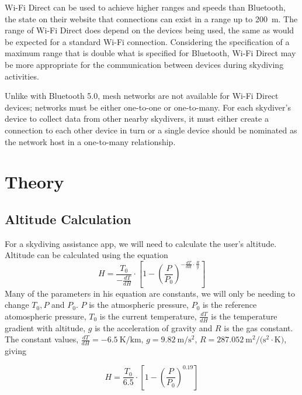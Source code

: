 \documentclass[11pt, twocolumn]{article}
\begin{document}
Wi-Fi Direct can be used to achieve higher ranges and speeds than Bluetooth, the \citeauthor{wi-fi_alliance_wi-fi_nodate} state on their website that connections can exist in a range up to \SI{200}{\metre}. The range of Wi-Fi Direct does depend on the devices being used, the same as would be expected for a standard Wi-Fi connection. Considering the specification of a maximum range that is double what is specified for Bluetooth, Wi-Fi Direct may be more appropriate for the communication between devices during skydiving activities.

Unlike with Bluetooth 5.0, mesh networks are not available for Wi-Fi Direct devices; networks must be either one-to-one or one-to-many. For each skydiver's device to collect data from other nearby skydivers, it must either create a connection to each other device in turn or a single device should be nominated as the network host in a one-to-many relationship.

\section{Theory}\label{sec:theory} %

\subsection{Altitude Calculation} %
For a skydiving assistance app, we will need to calculate the user's altitude. Altitude can be calculated using the equation
\begin{equation}
    H = \frac{T_0} {-\frac{dT}{dH}} \cdot \left[1-{\left(\frac{P} {P_0}\right)}^{-\frac{dT} {dH} \cdot \frac{R} {g}}\right]
\end{equation}
Many of the parameters in his equation are constants, we will only be needing to change $T_0, P$ and $P_0$. $P$ is the atmospheric pressure, $P_0$ is the reference atomospheric pressure, $T_0$ is the current temperature, $\frac{dT}{dH}$ is the temperature gradient with altitude, $g$ is the acceleration of gravity and $R$ is the gas constant. The constant values, $\frac{dT}{dH} = \SI{-6.5}{\kelvin\per\kilo\metre}$, $g = \SI{9.82}{\metre\per\second\squared}$, $R = \SI{287.052}{\metre\squared\per(\second\squared\cdot\kelvin)}$, giving~\cite{he_atmospheric_2012}

\begin{equation}
    H = \frac{T_0} {6.5} \cdot \left[1-{\left(\frac{P} {P_0}\right)}^{0.19}\right]
\end{equation}
\end{document}
